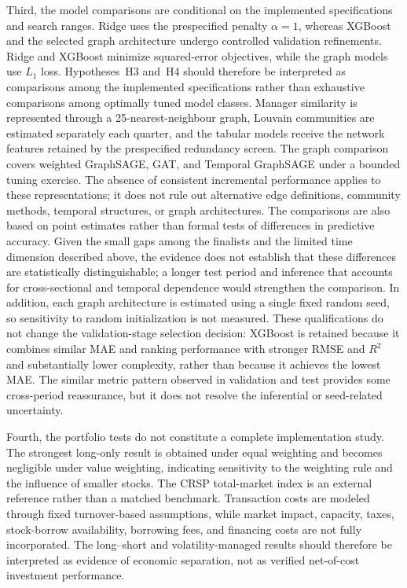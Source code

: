 Third, the model comparisons are conditional on the implemented specifications and search ranges. Ridge uses the prespecified penalty $\alpha=1$, whereas XGBoost and the selected graph architecture undergo controlled validation refinements. Ridge and XGBoost minimize squared-error objectives, while the graph models use $L_1$ loss. Hypotheses~H3 and~H4 should therefore be interpreted as comparisons among the implemented specifications rather than exhaustive comparisons among optimally tuned model classes. Manager similarity is represented through a 25-nearest-neighbour graph, Louvain communities are estimated separately each quarter, and the tabular models receive the network features retained by the prespecified redundancy screen. The graph comparison covers weighted GraphSAGE, GAT, and Temporal GraphSAGE under a bounded tuning exercise. The absence of consistent incremental performance applies to these representations; it does not rule out alternative edge definitions, community methods, temporal structures, or graph architectures. The comparisons are also based on point estimates rather than formal tests of differences in predictive accuracy. Given the small gaps among the finalists and the limited time dimension described above, the evidence does not establish that these differences are statistically distinguishable; a longer test period and inference that accounts for cross-sectional and temporal dependence would strengthen the comparison. In addition, each graph architecture is estimated using a single fixed random seed, so sensitivity to random initialization is not measured. These qualifications do not change the validation-stage selection decision: XGBoost is retained because it combines similar MAE and ranking performance with stronger RMSE and $R^2$ and substantially lower complexity, rather than because it achieves the lowest MAE. The similar metric pattern observed in validation and test provides some cross-period reassurance, but it does not resolve the inferential or seed-related uncertainty.

Fourth, the portfolio tests do not constitute a complete implementation study. The strongest long-only result is obtained under equal weighting and becomes negligible under value weighting, indicating sensitivity to the weighting rule and the influence of smaller stocks. The CRSP total-market index is an external reference rather than a matched benchmark. Transaction costs are modeled through fixed turnover-based assumptions, while market impact, capacity, taxes, stock-borrow availability, borrowing fees, and financing costs are not fully incorporated. The long--short and volatility-managed results should therefore be interpreted as evidence of economic separation, not as verified net-of-cost investment performance.
